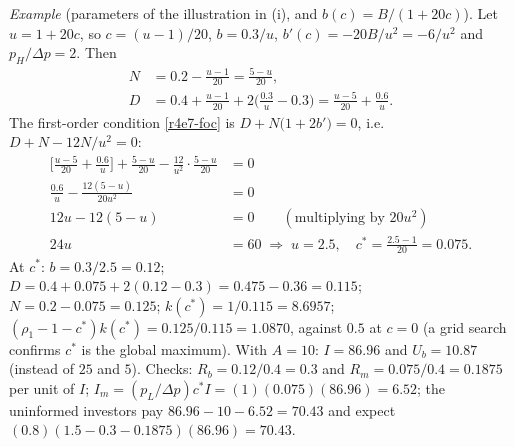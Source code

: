\documentclass[11pt,a4paper]{article}
\begin{document}
\emph{Example} (parameters of the illustration in (i), and $b(c)=B/(1+20c)$). Let $u=1+20c$, so
$c=(u-1)/20$, $b=0.3/u$, $b'(c)=-20B/u^2=-6/u^2$ and $p_H/\Delta p=2$. Then
\begin{align}
  N &= 0.2-\frac{u-1}{20} = \frac{5-u}{20}, \nonumber\\
  D &= 0.4+\frac{u-1}{20}+2\Big(\frac{0.3}{u}-0.3\Big) = \frac{u-5}{20}+\frac{0.6}{u}. \nonumber
\end{align}
The first-order condition \eqref{r4e7-foc} is $D+N\big(1+2b'\big)=0$, i.e.\ $D+N-12N/u^2=0$:
\begin{align}
  \Big[\frac{u-5}{20}+\frac{0.6}{u}\Big]+\frac{5-u}{20}-\frac{12}{u^2}\cdot\frac{5-u}{20} &= 0 \nonumber\\
  \frac{0.6}{u}-\frac{12(5-u)}{20u^2} &= 0 \nonumber\\
  12u-12(5-u) &= 0 \qquad(\text{multiplying by }20u^2) \nonumber\\
  24u &= 60 \;\Rightarrow\; u=2.5,\quad c^*=\frac{2.5-1}{20}=0.075. \nonumber
\end{align}
At $c^*$: $b=0.3/2.5=0.12$; $D=0.4+0.075+2(0.12-0.3)=0.475-0.36=0.115$; $N=0.2-0.075=0.125$;
$k(c^*)=1/0.115=8.6957$; $(\rho_1-1-c^*)k(c^*)=0.125/0.115=1.0870$, against $0.5$ at $c=0$
(a grid search confirms $c^*$ is the global maximum). With $A=10$: $I=86.96$ and $U_b=10.87$
(instead of $25$ and $5$). Checks: $R_b=0.12/0.4=0.3$ and $R_m=0.075/0.4=0.1875$ per unit of $I$;
$I_m=(p_L/\Delta p)c^*I=(1)(0.075)(86.96)=6.52$; the uninformed investors pay
$86.96-10-6.52=70.43$ and expect $(0.8)(1.5-0.3-0.1875)(86.96)=70.43$.
\end{document}
